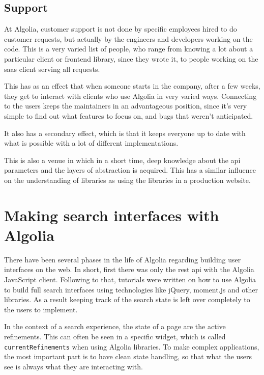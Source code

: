 \subsection{Support}
\label{support}

At Algolia, customer support is not done by specific employees hired to do customer requests, but actually by the engineers and developers working on the code. This is a very varied list of people, who range from knowing a lot about a particular client or frontend \gls{library}, since they wrote it, to people working on the \gls{saas} client serving all requests.

This has as an effect that when someone starts in the company, after a few weeks, they get to interact with clients who use Algolia in very varied ways. Connecting to the users keeps the maintainers in an advantageous position, since it's very simple to find out what features to focus on, and bugs that weren't anticipated.

It also has a secondary effect, which is that it keeps everyone up to date with what is possible with a lot of different implementations.

This is also a venue in which in a short time, deep knowledge about the \acrshort{api} parameters and the layers of abstraction is acquired. This has a similar influence on the understanding of libraries as using the libraries in a production website.

\section{Making search interfaces with Algolia} %
\label{sec:making_search_interfaces_with_algolia}

There have been several phases in the life of Algolia regarding building user interfaces on the web. In short, first there was only the \acrshort{rest} \acrshort{api} with the Algolia JavaScript client. Following to that, tutorials were written on how to use Algolia to build full search interfaces using technologies like jQuery, moment.js and other libraries. As a result keeping track of the search state is left over completely to the users to implement.

In the context of a search experience, the state of a page are the active refinements. This can often be seen in a specific widget, which is called {\tt currentRefinements} when using Algolia libraries. To make complex applications, the most important part is to have clean state handling, so that what the users see is always what they are interacting with.

